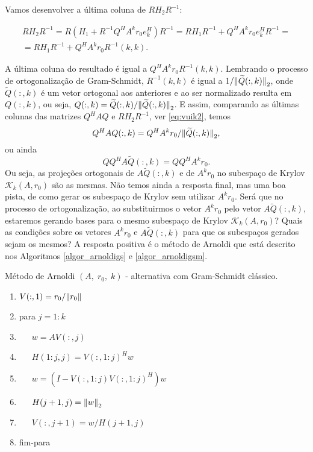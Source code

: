 {
     Vamos desenvolver a  última  coluna de $RH_2R^{-1}$:
   
     \begin{multline*}
          RH_2R^{-1}=R(H_1+R^{-1}Q^HA^kr_0e_k^H)R^{-1}=RH_1R^{-1}+Q^HA^kr_0e_k^HR^{-1}=\\
          =RH_1R^{-1}+Q^HA^kr_0R^{-1}(k,k).
          \end{multline*}

     A última coluna do resultado é  igual a $Q^HA^kr_0R^{-1}(k,k)$. Lembrando o processo de ortogonalização de Gram-Schmidt, $R^{-1}(k,k)$ é igual a $1/{\Vert \widetilde{Q}(:,k)\Vert}_2$, onde $\widetilde{Q}(:,k)$ é um vetor ortogonal aos anteriores  e ao ser normalizado resulta em ${Q}(:,k)$, ou seja, ${Q}(:,k)=\widetilde{Q}(:,k)/{\Vert \widetilde{Q}(:,k)\Vert}_2$. E assim, comparando as  últimas colunas das matrizes $Q^HAQ$ e $RH_2R^{-1}$, ver \eqref{eq:vuik2}, temos
     \[
     Q^HA{Q}(:,k)=Q^HA^kr_0/{\Vert \widetilde{Q}(:,k)\Vert}_2,
     \]
     ou ainda
     \[QQ^HA\widetilde{Q}(:,k)=QQ^HA^kr_0.\]
     Ou seja, as projeções ortogonais de $A\widetilde{Q}(:,k)$ e de $A^kr_0$ no subespaço de Krylov $\mathcal{K}_k(A,r_0)$ são  as mesmas. Não temos ainda a resposta final, mas uma boa pista, de como gerar os subespaço de Krylov sem utilizar $A^kr_0$. Será que no processo de ortogonalização, ao substituirmos  o vetor $A^kr_0$ pelo vetor $A\widetilde{Q}(:,k)$, estaremos gerando bases para o mesmo subespaço de Krylov $\mathcal{K}_k(A,r_0)$? Quais as condições sobre os vetores $A^kr_0$ e $A\widetilde{Q}(:,k)$ para que os subespaços gerados sejam os mesmos? A resposta positiva é o método de Arnoldi que está descrito nos Algoritmos \ref{algor_arnoldigs} e \ref{algor_arnoldigsm}.
}
     \begin{algor}[htb]
\caption{ Método  de Arnoldi $(A,\;r_0,\;k)$ - alternativa com Gram-Schmidt clássico.} \label{algor_arnoldigs}

{%
\begin{enumerate}
\renewcommand{\labelenumi}{\theenumi:}
\setlength{\itemsep}{.01cm}
\item $V(:,1)=r_0/{\Vert r_0\Vert}$
\item para $j=1:k$
\item~~~$w=AV(:,j)$
\item~~~$H(1:j,j)=V(:,1:j)^Hw$
\item~~~$w=(I-V(:,1:j)V(:,1:j)^H)w$
\item~~~$H(j+1,j)={\Vert w\Vert}_2$
\item~~~$V(:,j+1)=w/H(j+1,j)$
\item fim-para
\renewcommand{\labelenumi}{\theenumi.}
\end{enumerate}
}
\end{algor}
